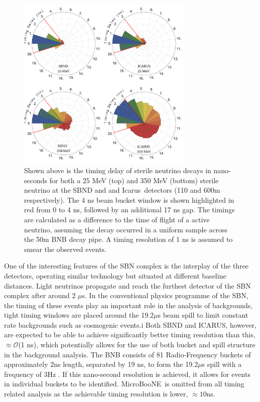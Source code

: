 \documentclass[11pt, a4paper]{article}
\def\muboone{MicroBooNE}
\def\icarus{Icarus}
\begin{document}
\begin{figure}[t]
%
\center
%
\includegraphics[width=0.75\textwidth]{figures/timing.pdf}
%
\caption{\label{fig:timing} Shown above is the timing delay of sterile neutrino
decays in nano-seconds for both a 25 MeV (top) and 350 MeV (bottom) sterile
neutrino at the SBND and and \icarus\ detectors (110 and 600m
respectively). The 4 ns beam bucket window is shown highlighted in red from 0
to 4 ns, followed by an additional 17 ns gap. The timings are calculated as a
difference to the time of flight of a active neutrino, assuming the decay
occurred in a uniform sample across the 50m BNB decay pipe. A timing resolution
of 1 ns is assumed to smear the observed events. }
%
\end{figure}

One of the interesting features of the SBN complex is the interplay of the
three detectors, operating similar technology but situated at different
baseline distances. Light neutrinos propagate and reach the furthest detector
of the SBN complex after around 2 $\mu$s. In the conventional physics programme
of the SBN, the timing of these events play an important role in the analysis
of backgrounds, tight timing windows are placed around the 19.2$\mu$s beam
spill to limit constant rate backgrounds such as cosmogenic events.i Both SBND
and ICARUS, however, are expected to be able to achieve significantly better
timing resolution than this, $\approx \mathcal{O}$(1 ns), which potentially allows for the use of both bucket
and spill structure in the background analysis. The BNB consists of 81
Radio-Frequency buckets of approximately 2ns length, separated by 19 ns, to
form the 19.2$\mu$s spill with a frequency of 3Hz \cite{Antonello:2015lea}.
If this nano-second resolution is achieved, it allows for events in individual buckets to be
identified. \muboone\ is omitted from all timing related analysis as the achievable timing
resolution is lower, $\approx 10$ns.
\end{document}
